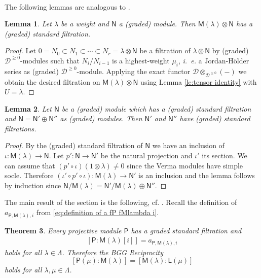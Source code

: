 \documentclass[reqno]{amsart}
\renewcommand{\_}[1]{_{\left( #1 \right)}}
\renewcommand{\^}[1]{^{\left( #1 \right)}}
\newcommand{\ot}{{\otimes}}
\newcommand\fL{\mathsf{L}}
\newcommand\fM{\mathsf{M}}
\newcommand\fN{\mathsf{N}}
\newcommand\fP{\mathsf{P}}
\newcommand{\D}{\mathcal{D}}
\theoremstyle{plain}
\newtheorem{lema}{Lemma}[section]
\newtheorem{theorem}[lema]{Theorem}
\theoremstyle{definition}
\theoremstyle{remark}
\begin{document}
\

The following lemmas are analogous to \cite[Theorem 3.6 and Proposition 3.7 (b)]{MR2428237}.
\begin{lema}\label{le: verma ot N tiene standard filtration}
Let $\lambda$ be a weight and $\fN$ a (graded) module. Then $\fM(\lambda)\ot\fN$ has a (graded) standard filtration. 
\end{lema}

\begin{proof}
Let $0=N_0\subset N_1\subset\cdots\subset N_r=\lambda\ot\fN$ be a filtration of $\lambda\ot\fN$ by (graded) $\D^{\geq0}$-modules such that $N_i/N_{i-1}$ is a highest-weight $\mu_i$, {\it i.~e.} a Jordan-H\"older series as (graded) $\D^{\geq0}$-module. Applying the exact functor $\D\ot_{\D^{\geq0}}(-)$ we obtain the desired filtration on $\fM(\lambda)\ot\fN$ using Lemma \ref{le:tensor identity} with $U=\lambda$.
\end{proof}

\begin{lema}\label{le:N Nprima y Nsegunda tienen filtration standard}
Let $\fN$ be a (graded) module which has a (graded) standard filtration and $\fN=\fN'\oplus\fN''$ as (graded) modules. Then $\fN'$ and $\fN''$ have (graded) standard filtrations.
\end{lema}

\begin{proof}
By the (graded) standard filtration of $\fN$ we have an inclusion of $\iota:\fM(\lambda)\longrightarrow\fN$. Let $p':\fN\longrightarrow\fN'$ be the natural projection and $\iota'$ its section. We can assume that  $(p'\circ\iota)(1\ot\lambda)\neq0$ since the Verma modules have simple socle. Therefore $(\iota'\circ p'\circ\iota):\fM(\lambda)\longrightarrow\fN'$ is an inclusion and the lemma follows by induction since $\fN/\fM(\lambda)=\fN'/\fM(\lambda)\oplus\fN''$.
\end{proof}

The main result of the section is the following, cf. \cite[Theorems 3.10 and 3.11]{MR2428237}. Recall the definition of $a_{\fP,\fM(\lambda),i}$ from \eqref{eq:definition of a fP fMlambda i}.

\begin{theorem}\label{teo:standard filtration BGG}
Every projective module $\fP$ has a graded standard filtration and 
\begin{align*}
\left[\fP:\fM(\lambda)[i]\right]=a_{\fP,\fM(\lambda),i} 
\end{align*}
holds for all $\lambda\in\Lambda$. Therefore the BGG Reciprocity
$$%
[\fP(\mu):\fM(\lambda)]=[\fM(\lambda):\fL(\mu)]
$$%
holds for all $\lambda,\mu\in\Lambda$.
\end{theorem}
\end{document}

